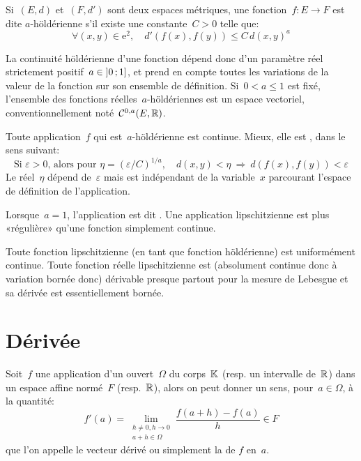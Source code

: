\medskip
\begin{definition}
Si~$(E, d)$ et~$(F, d')$ sont deux espaces métriques, une fonction~$f: E \rightarrow F$ est dite $a$-höldérienne s'il existe une constante~$C > 0$ telle que:
\begin{equation}
  \forall (x, y) \in \mathrm{e}^2,\quad d'\left(f(x), f(y)\right) \le C\,d\left(x,y\right)^a
\end{equation}
\end{definition}
\medskip
La continuité höldérienne d'une fonction dépend donc d'un paramètre réel strictement positif~$a \in \mathopen{]}0\,;1\mathclose{]}$, et prend en compte toutes les variations de la valeur de la fonction sur son ensemble de définition.
\medskip
Si~$0 < a \le 1$ est fixé, l'ensemble des fonctions réelles~$a$-höldériennes est un espace vectoriel, conventionnellement noté~$\mathcal{C}^{0, a}(E,\mathbb R)$.

\medskip
\begin{theoreme}
Toute application~$f$ qui est~$a$-höldérienne est continue. Mieux, elle est , dans le sens suivant:
\begin{equation}
\text{Si } \varepsilon>0\text{, alors pour } \eta = \left( \varepsilon / C \right)^{1 / a},\quad d\left( x, y \right) < \eta \ \Rightarrow\ d\left( f(x), f(y) \right) < \varepsilon
\end{equation}
Le réel~$\eta$ dépend de~$\varepsilon$ mais est indépendant de la variable~$x$ parcourant l'espace de définition de l'application.
\end{theoreme}
\begin{definition}
Lorsque~$a = 1$, l'application est dit .
Une application lipschitzienne est plus «régulière» qu'une fonction simplement continue.
\end{definition}
\medskip
Toute fonction lipschitzienne (en tant que fonction höldérienne) est uniformément continue.
\medskip
Toute fonction réelle lipschitzienne est (absolument continue donc à variation bornée donc) dérivable presque partout pour la mesure de Lebesgue et sa dérivée est essentiellement bornée.
\medskip
\section{Dérivée}
\medskip
\begin{definition}
Soit~$f$ une application d'un ouvert~$\Omega$ du corps~$\mathbb K$ (resp. un intervalle de~$\mathbb R$) dans un espace affine normé~$F$ (resp.~$\mathbb R$), alors on peut donner un sens, pour~$a\in\Omega$, à la quantité:
\begin{equation}
f'(a)=\lim_{\substack{h\ne0,h\to0\\a+h\in\Omega}} \dfrac{f(a+h)-f(a)}h \in F
\end{equation}
que l'on appelle le vecteur dérivé ou simplement la  de $f$ en~$a$.
\end{definition}

